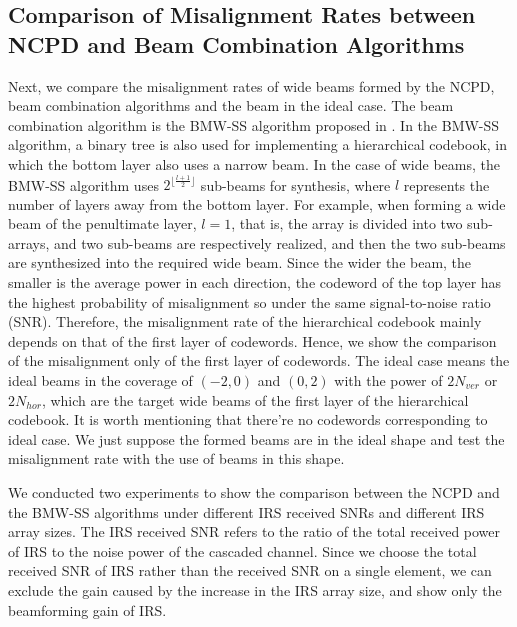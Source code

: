 \documentclass[12pt,draftclsnofoot,onecolumn]{IEEEtran}
\begin{document}
	
	
	
	
	
	
	\subsection{Comparison of Misalignment Rates between NCPD  and Beam Combination Algorithms}
	
	Next, we  compare the misalignment rates of wide beams formed by the NCPD, beam combination algorithms and the beam in the ideal case. The beam combination algorithm is the BMW-SS algorithm proposed in \cite{DBLP:journals/twc/XiaoHXX16}. In the BMW-SS algorithm, a binary tree is also used for implementing a hierarchical codebook, in which the bottom layer also uses a narrow beam. In the case of wide beams, the BMW-SS algorithm  uses $2^{\lfloor \frac{l+1}{2}\rfloor}$ sub-beams for synthesis, where $l$ represents the number of layers away from the bottom layer. For example, when forming a wide beam of the penultimate layer, $l=1$, that is, the array is divided into two sub-arrays, and two sub-beams are respectively realized, and then the two sub-beams are synthesized into the required wide beam.  Since the wider the beam, the smaller is the average power in each direction,  the codeword of the top layer has the highest probability of misalignment so under the same signal-to-noise ratio (SNR). Therefore, the misalignment  rate of the hierarchical  codebook mainly depends on that of the first layer of codewords. Hence, we  show the comparison of the misalignment only of the first layer of codewords. The ideal case means the ideal beams in the coverage of $(-2,0)$ and $(0,2)$ with the power of $2N_{ver}$ or $2N_{hor}$, which are the target wide beams of the first layer of the hierarchical codebook. It is worth mentioning that there're no codewords corresponding to ideal case. We just suppose the formed beams are in the ideal shape and test the misalignment rate with the use of beams in this shape.
	
	We conducted two experiments to show the comparison between the NCPD  and the BMW-SS algorithms under different IRS received SNRs and different IRS array sizes. The IRS received SNR refers to the ratio of the total received power of  IRS to the noise power of the cascaded channel. Since we choose the total received SNR of  IRS rather than the received SNR on a single element, we can exclude the gain caused by the increase in the IRS array size, and  show only the beamforming gain of  IRS.
	
\end{document}

